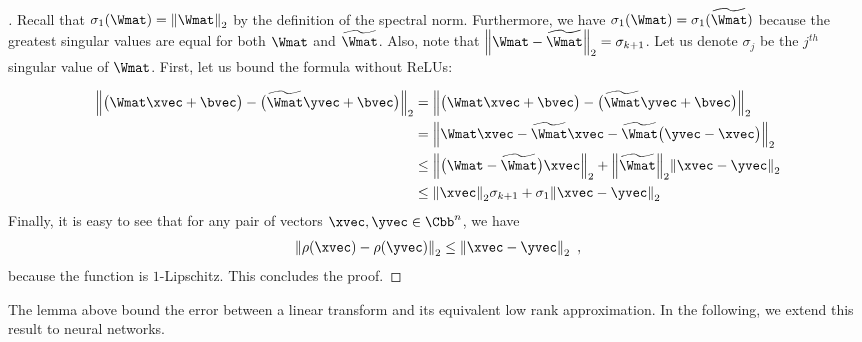 \begin{proof}[]
  Recall that $\sigma_1(\Wmat) = \norm{\Wmat}_2$ by the definition of the spectral norm.
  Furthermore, we have $\sigma_1(\Wmat) = \sigma_1(\widetilde{\Wmat})$ because the greatest singular values are equal for both $\Wmat$ and $\widetilde{\Wmat}$.
  Also, note that $\norm{\Wmat - \widetilde{\Wmat}}_{2} = \sigma_{k+1}$.
  Let us denote $\sigma_j$ be the $j^{th}$ singular value of $\Wmat$.
  First, let us bound the formula without ReLUs:

  \begin{align}
    \norm{\big(\Wmat\xvec+\bvec\big) - \big(\widetilde{\Wmat} \yvec + \bvec \big)}_2 &= \norm{\big(\Wmat \xvec+ \bvec \big) - \big(\widetilde{\Wmat} \yvec + \bvec \big)}_2 \\
     &= \norm{\Wmat\xvec - \widetilde{\Wmat} \xvec - \widetilde{\Wmat} \big(\yvec - \xvec \big)}_2 \\
     &\le \norm{\big(\Wmat - \widetilde{\Wmat}\big)\xvec}_2 + \norm{\widetilde{\Wmat}}_{2} \norm{\xvec - \yvec}_2 \\
     &\le \norm{\xvec}_2 \sigma_{k+1} + \sigma_1 \norm{\xvec - \yvec}_2 
  \end{align}
  Finally, it is easy to see that for any pair of vectors $\xvec,\yvec \in \Cn$, we have
  \begin{equation}
    \norm{ \act(\xvec) - \act(\yvec)}_2 \le \norm{\xvec - \yvec}_2 \enspace,
  \end{equation}
  because the \relu function is $1$-Lipschitz.
  This concludes the proof.
\end{proof}

The lemma above bound the error between a linear transform and its equivalent low rank approximation.
In the following, we extend this result to neural networks.


